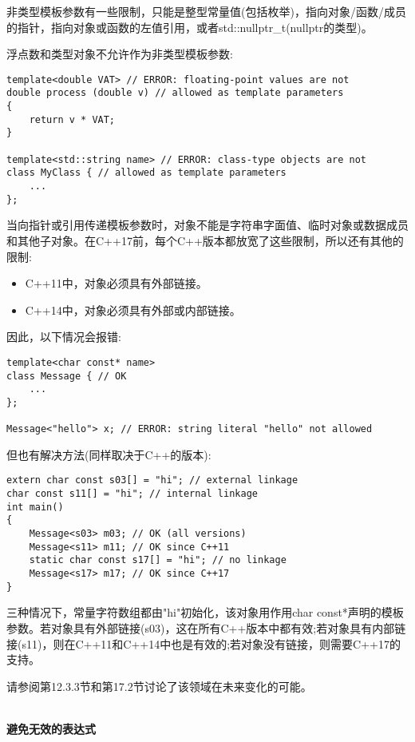 非类型模板参数有一些限制，只能是整型常量值(包括枚举)，指向对象/函数/成员的指针，指向对象或函数的左值引用，或者std::nullptr\_t(nullptr的类型)。

浮点数和类型对象不允许作为非类型模板参数:

\begin{lstlisting}[style=styleCXX]
template<double VAT> // ERROR: floating-point values are not
double process (double v) // allowed as template parameters
{
	return v * VAT;
}

template<std::string name> // ERROR: class-type objects are not
class MyClass { // allowed as template parameters
	...
};
\end{lstlisting}

当向指针或引用传递模板参数时，对象不能是字符串字面值、临时对象或数据成员和其他子对象。在C++17前，每个C++版本都放宽了这些限制，所以还有其他的限制:

\begin{itemize}
\item 
C++11中，对象必须具有外部链接。

\item 
C++14中，对象必须具有外部或内部链接。
\end{itemize}

因此，以下情况会报错:

\begin{lstlisting}[style=styleCXX]
template<char const* name>
class Message { // OK
	...
};

Message<"hello"> x; // ERROR: string literal "hello" not allowed
\end{lstlisting}

但也有解决方法(同样取决于C++的版本):

\begin{lstlisting}[style=styleCXX]
extern char const s03[] = "hi"; // external linkage
char const s11[] = "hi"; // internal linkage
int main()
{
	Message<s03> m03; // OK (all versions)
	Message<s11> m11; // OK since C++11
	static char const s17[] = "hi"; // no linkage
	Message<s17> m17; // OK since C++17
}
\end{lstlisting}

三种情况下，常量字符数组都由"hi"初始化，该对象用作用char const*声明的模板参数。若对象具有外部链接(s03)，这在所有C++版本中都有效;若对象具有内部链接(s11)，则在C++11和C++14中也是有效的;若对象没有链接，则需要C++17的支持。

请参阅第12.3.3节和第17.2节讨论了该领域在未来变化的可能。

\hspace*{\fill} \\ %
\noindent
\textbf{避免无效的表达式}


